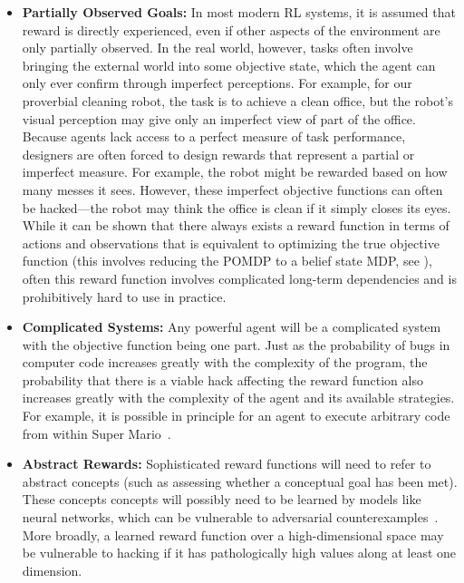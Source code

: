 \documentclass[a4paper,10pt]{article}
\begin{document}
\begin{itemize}
\item {\bf Partially Observed Goals:}  In most modern RL systems, it is assumed that reward is directly experienced, even if other aspects of the environment are only partially observed.  In the real world, however, tasks often involve bringing the external world into some objective state, which the agent can only ever confirm through imperfect perceptions.  For example, for our proverbial cleaning robot, the task is to achieve a clean office, but the robot's visual perception may give only an imperfect view of part of the office.  Because agents lack access to a perfect measure of task performance, designers are often forced to design rewards that represent a partial or imperfect measure.  For example, the robot might be rewarded based on how many messes it sees.  However, these imperfect objective functions can often be hacked---the robot may think the office is clean if it simply closes its eyes.  While it can be shown that there always exists a reward function in terms of actions and observations that is equivalent to optimizing the true objective function (this involves reducing the POMDP to a belief state MDP, see \cite{kaelbling1998planning}), often this reward function involves complicated long-term dependencies and is prohibitively hard to use in practice. 

\item {\bf Complicated Systems:} Any powerful agent will be a complicated system with the objective function being one part.  Just as the probability of bugs in computer code increases greatly with the complexity of the program, the probability that there is a viable hack affecting the reward function also increases greatly with the complexity of the agent and its available strategies.  For example, it is possible in principle for an agent to execute arbitrary code from within Super Mario~\cite{masterjun2014mario}.

\item {\bf Abstract Rewards:} Sophisticated reward functions will need to refer to abstract concepts (such as assessing whether a conceptual goal has been met). These concepts concepts will possibly need to be learned by models like neural networks, which can be vulnerable to adversarial counterexamples~\cite{szegedy2013intriguing,goodfellow2014explaining}.  More broadly, a learned reward function over a high-dimensional space may be vulnerable to hacking if it has pathologically high values along at least one dimension.


\end{itemize}
\end{document}
